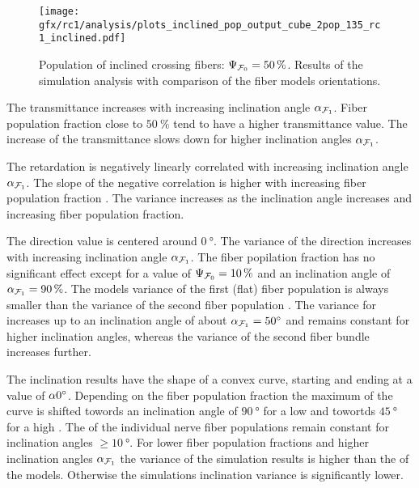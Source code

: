     \begin{figure}[!p]
    \centering
    \texttt{[image: gfx/rc1/analysis/plots\_inclined\_pop\_output\_cube\_2pop\_135\_rc1\_inclined.pdf]}
    \caption{Population of inclined crossing fibers: $\textnormal{$\Psi_{\textnormal{$\mathcal{F}_0$}}$}=\SI{50}{\percent}$. Results of the simulation analysis with comparison of the fiber models orientations.}
    \label{fig:inclined_05_fiber_pop_rofl}
\end{figure}
% 
The transmittance increases with increasing inclination angle $\textnormal{$\alpha$}_{\textnormal{$\mathcal{F}_1$}}$.
Fiber population fraction close to $\SI{50}{\percent}$ tend to have a higher transmittance value.
The increase of the transmittance slows down for higher inclination angles  $\textnormal{$\alpha$}_{\textnormal{$\mathcal{F}_1$}}$.
\par
The retardation is negatively linearly correlated with increasing inclination angle $\textnormal{$\alpha$}_{\textnormal{$\mathcal{F}_1$}}$.
The slope of the negative correlation is higher with increasing fiber population fraction \modelPsi{}.
The variance increases as the inclination angle increases and increasing fiber population fraction.
\par
The direction value is centered around $\SI{0}{\degree}$.
The variance of the direction increases with increasing inclination angle $\textnormal{$\alpha$}_{\textnormal{$\mathcal{F}_1$}}$.
The fiber popilation fraction has no significant effect except for a value of $\textnormal{$\Psi_{\textnormal{$\mathcal{F}_0$}}$} = \SI{10}{\percent}$ and an inclination angle of $\textnormal{$\alpha$}_{\textnormal{$\mathcal{F}_1$}}=\SI{90}{\percent}$.
The models \bvariance{} variance of the first (flat) fiber population \popa{} is always smaller than the \bvariance{} variance of the second fiber population \popb{}.
The \bvariance{} variance for \popa{} increases up to an inclination angle of about $\textnormal{$\alpha$}_{\textnormal{$\mathcal{F}_1$}} = \SI{50}{\degree}$ and remains constant for higher inclination angles, whereas the \bvariance{} variance of the second fiber bundle increases further.
\par
The inclination results have the shape of a convex curve, starting and ending at a value of $\textnormal{$\alpha$}\SI{0}{\degree}$.
Depending on the fiber population fraction \modelPsi{} the maximum of the curve is shifted towords an inclination angle of $\SI{90}{\degree}$ for a low \modelPsi{} and towortds $\SI{45}{\degree}$ for a high \modelPsi{}.
The \bvariance{} of the individual nerve fiber populations remain constant for inclination angles $\geq \SI{10}{\degree}$. 
For lower fiber population fractions \modelPsi{} and higher inclination angles $\textnormal{$\alpha$}_{\textnormal{$\mathcal{F}_1$}}$ the variance of the simulation results is higher than the \bvariance{} of the models.
Otherwise the simulations inclination variance is significantly lower.
